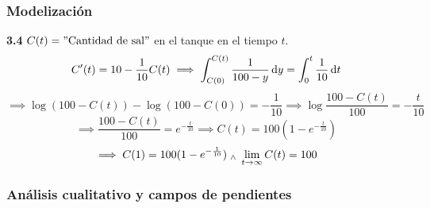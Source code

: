 \subsubsection{Modelización}

\textbf{3.4} $C(t)="\text{Cantidad de sal}"$ en el tanque en el tiempo $t$. 
\[C'(t)=10-\frac{1}{10}C(t) \implies \int_{C(0)}^{C(t)} \frac{1}{100-y}\odif{y} = \int_{0}^{t}\frac{1}{10}\odif{t}\]
\[\implies \log{(100-C(t))} - \log{(100-C(0))}=-\frac{1}{10}\implies \log{\frac{100-C(t)}{100}}=-\frac{t}{10}\]
\[\implies \frac{100-C(t)}{100}=e^{-\frac{t}{10}}\implies C(t)=100(1-e^{-\frac{t}{10}})\]
\[\implies C(1)=100(1-e^{-\frac{1}{10}}) \; _{\wedge} \; \lim_{t\to \infty} C(t) = 100\]

\subsubsection{Análisis cualitativo y campos de pendientes}

